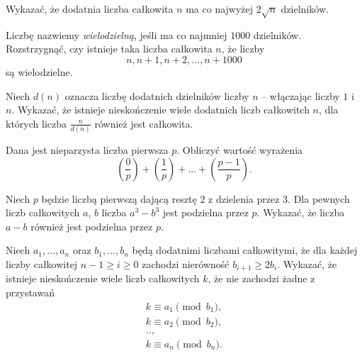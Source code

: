 \begin{problem}{1}
	Wykazać, że dodatnia liczba całkowita $n$ ma co najwyżej $2\sqrt{n}$ dzielników.
\end{problem}

\begin{problem}{2}
	Liczbę nazwiemy \textit{wielodzielną}, jeśli ma co najmniej $1000$ dzielników. Rozstrzygnąć, czy istnieje taka liczba całkowita $n$, że liczby
	\[
		n, n + 1, n + 2, ..., n + 1000
	\]
	są wielodzielne.
\end{problem}

\begin{problem}{3}
	Niech $d(n)$ oznacza liczbę dodatnich dzielników liczby $n$ -- włączając liczby $1$ i $n$. Wykazać, że istnieje nieskończenie wiele dodatnich liczb całkowitch $n$, dla których liczba $\frac{n}{d(n)}$ również jest całkowita.
\end{problem}

\begin{problem}{4}
	Dana jest nieparzysta liczba pierwsza $p$. Obliczyć wartość wyrażenia
	\[
		\left(\frac{0}{p}\right) + 
		\left(\frac{1}{p}\right) + 
		... +
		\left(\frac{p - 1}{p}\right).
	\]
\end{problem}

\begin{problem}{5}
	Niech $p$ będzie liczbą pierwszą dającą resztę $2$ z dzielenia przez $3$. Dla pewnych liczb całkowitych $a$, $b$ liczba $a^3 - b^3$ jest podzielna przez $p$. Wykazać, że liczba $a - b$ również jest podzielna przez $p$.
\end{problem}


\begin{problem}{6}
	Niech $a_1, ..., a_n$ oraz $b_1, ..., b_n$ będą dodatnimi liczbami całkowitymi, że dla każdej liczby całkowitej $n - 1\geqslant i \geqslant 0$ zachodzi nierówność $b_{i + 1} \geqslant 2b_{i}$. Wykazać, że istnieje nieskończenie wiele liczb całkowitych $k$, że nie zachodzi żadne z przystawań
	\begin{gather*}
		k \equiv a_1 \pmod{b_1}, \\
		k \equiv a_2 \pmod{b_2}, \\
		.., \\
		k \equiv a_n \pmod{b_n}.
	\end{gather*}
\end{problem}

